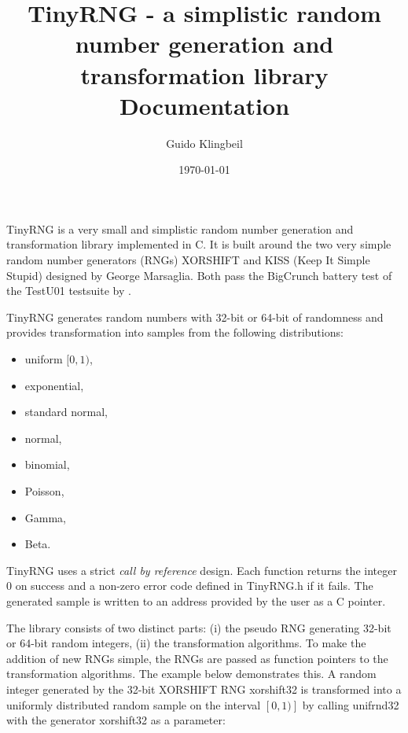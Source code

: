 \documentclass[a4paper]{scrartcl}
\title{TinyRNG - a simplistic random number generation and transformation library\\
{\normalsize Documentation}
}
\author{Guido Klingbeil}
\date{\today}
\begin{document}
\setlength{\parindent}{0pt}
\maketitle
\vspace{-2.2cm}
\section*{}

TinyRNG is a very small and simplistic random number generation and transformation library implemented in C. It is built around the two very simple random number generators (RNGs) XORSHIFT and KISS (Keep It Simple Stupid) designed by George Marsaglia. Both pass the BigCrunch battery test of the TestU01 testsuite by \citet{L'Ecuyer2007}.

TinyRNG generates random numbers with 32-bit or 64-bit of randomness and provides transformation into samples from the following distributions:

\begin{itemize}
  \item uniform $[0,1)$,
  \item exponential,
  \item standard normal,
  \item normal,
  \item binomial,
  \item Poisson,
  \item Gamma,
  \item Beta.
\end{itemize}


TinyRNG uses a strict {\it call by reference} design. Each function returns the integer $0$ on success and a non-zero error code defined in {\sf TinyRNG.h} if it fails. The generated sample is written to an address provided by the user as a C pointer.

The library consists of two distinct parts: (i) the pseudo RNG generating 32-bit or 64-bit random integers, (ii) the transformation algorithms. To make the addition of new RNGs simple, the RNGs are passed as function pointers to the transformation algorithms. The example below demonstrates this. A random integer generated by the 32-bit XORSHIFT RNG {\sf xorshift32} is transformed into a uniformly distributed random sample on the interval $[0, 1)]$ by calling {\sf unifrnd32} with the generator {\sf xorshift32} as a parameter:
 
\end{document}
